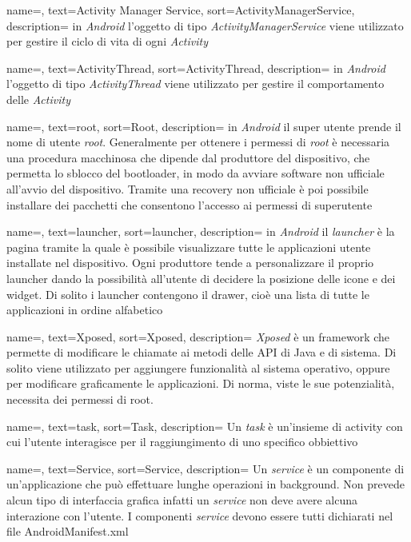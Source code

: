 {
	name=,
	text=Activity Manager Service,
	sort=ActivityManagerService,
	description={ in \emph{Android} l'oggetto di tipo \emph{ActivityManagerService} viene utilizzato per gestire il ciclo di vita di ogni \emph{Activity} }
}

{
	name=,
	text=ActivityThread,
	sort=ActivityThread,
	description={ in \emph{Android} l'oggetto di tipo \emph{ActivityThread} viene utilizzato per gestire il comportamento delle \emph{Activity} }
}

{
	name=,
	text=root,
	sort=Root,
	description={ in \emph{Android} il super utente prende il nome di utente \emph{root}. Generalmente per ottenere i permessi di \emph{root} è necessaria una procedura macchinosa che dipende dal produttore del dispositivo, che permetta lo sblocco del bootloader, in modo da avviare software non ufficiale all'avvio del dispositivo. Tramite una recovery non ufficiale è poi possibile installare dei pacchetti che consentono l'accesso ai permessi di superutente }
}

{
	name=,
	text=launcher,
	sort=launcher,
	description={ in \emph{Android} il \emph{launcher} è la pagina tramite la quale è possibile visualizzare tutte le applicazioni utente installate nel dispositivo. Ogni produttore tende a personalizzare il proprio launcher dando la possibilità all'utente di decidere la posizione delle icone e dei widget. Di solito i launcher contengono il drawer, cioè una lista di tutte le applicazioni in ordine alfabetico  }
}

{
	name=,
	text=Xposed,
	sort=Xposed,
	description={ \emph{Xposed} è un framework che permette di modificare le chiamate ai metodi delle API di Java e di sistema. Di solito viene utilizzato per aggiungere funzionalità al sistema operativo, oppure per modificare graficamente le applicazioni. Di norma, viste le sue potenzialità, necessita dei permessi di root. }
}

{
	name=,
	text=task,
	sort=Task,
	description={ Un \emph{task} è un'insieme di activity con cui l'utente interagisce per il raggiungimento di uno specifico obbiettivo }
}

{
	name=,
	text=Service,
	sort=Service,
	description={ Un \emph{service} è un componente di un'applicazione che può effettuare lunghe operazioni in background. Non prevede alcun tipo di interfaccia grafica infatti un \emph{service} non deve avere alcuna interazione con l'utente. I componenti \emph{service} devono essere tutti dichiarati nel file AndroidManifest.xml }
}

